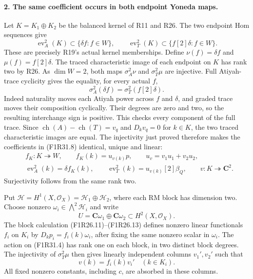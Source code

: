 \paragraph{2. The same coefficient occurs in both endpoint Yoneda maps.}
Let $K=K_1\oplus K_2$ be the balanced kernel
of R11 and R26. The two endpoint Hom
sequences give
\[
 \operatorname{ev}_A^2(K)\subset
      \{\delta f:f\in W\},\qquad
 \operatorname{ev}_T^2(K)\subset
      \{f[2]\delta:f\in W\}.
 \tag{F1R31.8}
\]
These are precisely R19's actual kernel
memberships. Define $\nu(f)=\delta f$
and $\mu(f)=f[2]\delta$. The traced
characteristic image of each endpoint
on $K$ has rank two by R26. As
$\dim W=2$, both maps
$\sigma_A^2\nu$ and $\sigma_T^2\mu$
are injective. Full Atiyah-trace cyclicity
gives the equality, for every actual $f$,
\[
                  \sigma_A^2(\delta f)
                         =\sigma_T^2(f[2]\delta).
 \tag{F1R31.9}
\]
Indeed naturality moves each Atiyah power
across $f$ and $\delta$, and graded trace
moves their composition cyclically. Their
degrees are zero and two, so the resulting
interchange sign is positive. This checks
every component of the full trace.
Since $\operatorname{ch}(A)-\operatorname{ch}(T)=v_q$
and $D_kv_q=0$ for $k\in K$, the two
traced characteristic images are equal.
The injectivity just proved therefore makes
the coefficients in (F1R31.8) identical,
unique and linear:
\[
 \begin{split}
 &f_K:K\twoheadrightarrow W,\qquad
       f_K(k)=u_{v(k)}p,\qquad
       u_v=v_1u_1+v_2u_2,\\
 &\operatorname{ev}_A^2(k)=\delta f_K(k),\qquad
       \operatorname{ev}_T^2(k)=u_{v(k)}[2]\beta_Q,
       \qquad v:K\twoheadrightarrow\mathbf C^2.
 \end{split}
 \tag{F1R31.10}
\]
Surjectivity follows from the same rank two.

Put $\mathcal H=H^1(X,\mathcal O_X)
=\mathcal H_1\oplus\mathcal H_2$, where each
RM block has dimension two. Choose nonzero
$\omega_i\in\bigwedge^2\mathcal H_i$ and write
\[
                         U=\mathbf C\omega_1\oplus\mathbf C\omega_2
                               \subset H^2(X,\mathcal O_X).
 \tag{F1R31.11}
\]
The block calculation (F1R26.11)--(F1R26.13)
defines nonzero linear functionals $f_i$ on
$K_i$ by $D_kp_i=f_i(k)\omega_i$, after
fixing the same nonzero scalar in $\omega_i$.
The action on (F1R31.4) has rank one on
each block, in two distinct block degrees.
The injectivity of $\sigma_T^2\mu$ then gives
linearly independent columns $v_1',v_2'$
such that
\[
                         v(k)=f_i(k)v_i'\quad(k\in K_i).
 \tag{F1R31.12}
\]
All fixed nonzero constants, including $c$,
are absorbed in these columns.

